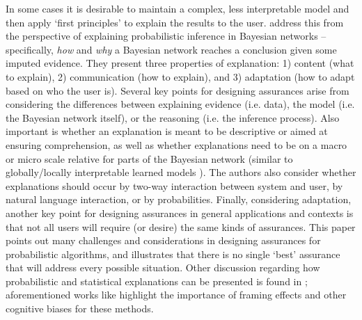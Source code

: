 In some cases it is desirable to maintain a complex, less interpretable model and then apply `first principles' to explain the results to the user. \citet{Lacave2002-cu} address this from the perspective of explaining probabilistic inference in Bayesian networks -- specifically, \emph{how} and \emph{why} a Bayesian network reaches a conclusion given some imputed evidence. 
They present three properties of explanation: 1) content (what to explain), 2) communication (how to explain), and 3) adaptation (how to adapt based on who the user is). %
Several key points for designing assurances arise from considering the differences between explaining evidence (i.e. data), the model (i.e. the Bayesian network itself), or the reasoning (i.e. the inference process). 
Also important is whether an explanation is meant to be descriptive or aimed at ensuring comprehension, as well as whether explanations need to be on a macro or micro scale relative for parts of the Bayesian network (similar to globally/locally interpretable learned models \cite{Ruping2006-xj}). 
The authors also consider whether explanations should occur by two-way interaction between system and user, by natural language interaction, or by probabilities. Finally, considering adaptation, another key point for designing assurances in general applications and contexts is that not all users will require (or desire) the same kinds of assurances. This paper points out many challenges and considerations in designing assurances for probabilistic algorithms, and illustrates that %
there is no single `best' assurance that will address every possible situation. 
Other discussion regarding how probabilistic and statistical explanations can be presented is found in \cite{Rouse1986-dz,Wallace2001-fm,Kuhn1997-qc,Lomas2012-ie,Swartout1983-ko}; 
aforementioned works like \cite{Kuhn1997-qc} highlight the importance of framing effects and other cognitive biases for these methods. 


